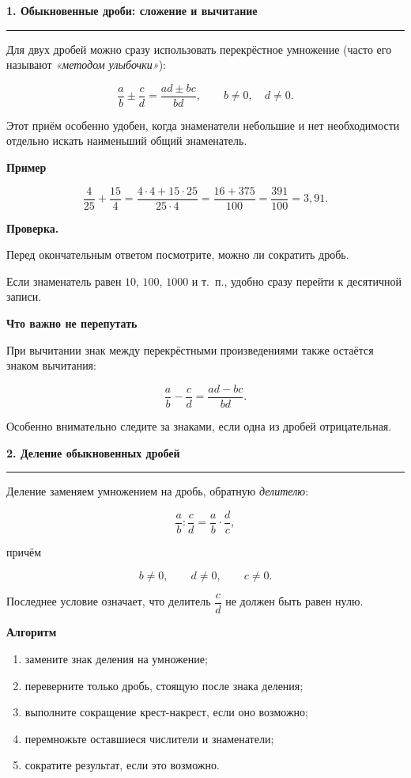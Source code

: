 \documentclass[a4paper,12pt]{article}
\newcommand{\topic}[1]{%
    \par\vspace{0.9em}%
    {\Large\bfseries\color{darkaccent}#1}\par
    \vspace{0.25em}
    \noindent
    \color{accent}\rule{\linewidth}{0.6pt}
    \color{black}
    \vspace{0.55em}
}
\newcommand{\subtopic}[1]{%
    \par\vspace{0.55em}%
    {\large\bfseries\color{textgray}#1}\par
    \vspace{0.2em}
}
\newcommand{\important}[1]{%
    \textbf{\color{darkaccent}#1}%
}
\begin{document}
\setcounter{page}{1}


\topic{1. Обыкновенные дроби: сложение и вычитание}

Для двух дробей можно сразу использовать перекрёстное умножение
(часто его называют \emph{«методом улыбочки»}):

\[
\frac{a}{b}\pm\frac{c}{d}
=
\frac{ad\pm bc}{bd},
\qquad
b\ne0,\quad d\ne0.
\]

Этот приём особенно удобен, когда знаменатели небольшие и нет
необходимости отдельно искать наименьший общий знаменатель.

\subtopic{Пример}

\[
\frac{4}{25}+\frac{15}{4}
=
\frac{4\cdot4+15\cdot25}{25\cdot4}
=
\frac{16+375}{100}
=
\frac{391}{100}
=
3{,}91.
\]

\important{Проверка.}
Перед окончательным ответом посмотрите, можно ли сократить дробь.

Если знаменатель равен $10$, $100$, $1000$ и т.~п.,
удобно сразу перейти к десятичной записи.

\subtopic{Что важно не перепутать}

При вычитании знак между перекрёстными произведениями также остаётся
знаком вычитания:

\[
\frac{a}{b}-\frac{c}{d}
=
\frac{ad-bc}{bd}.
\]

Особенно внимательно следите за знаками, если одна из дробей
отрицательная.


\topic{2. Деление обыкновенных дробей}

Деление заменяем умножением на дробь, обратную
\emph{делителю}:

\[
\frac{a}{b}:\frac{c}{d}
=
\frac{a}{b}\cdot\frac{d}{c},
\]

причём

\[
b\ne0,\qquad d\ne0,\qquad c\ne0.
\]

Последнее условие означает, что делитель
$\dfrac{c}{d}$ не должен быть равен нулю.

\subtopic{Алгоритм}

\begin{enumerate}[label=\arabic*)]
    \item замените знак деления на умножение;
    \item переверните только дробь, стоящую после знака деления;
    \item выполните сокращение крест-накрест, если оно возможно;
    \item перемножьте оставшиеся числители и знаменатели;
    \item сократите результат, если это возможно.
\end{enumerate}
\end{document}
